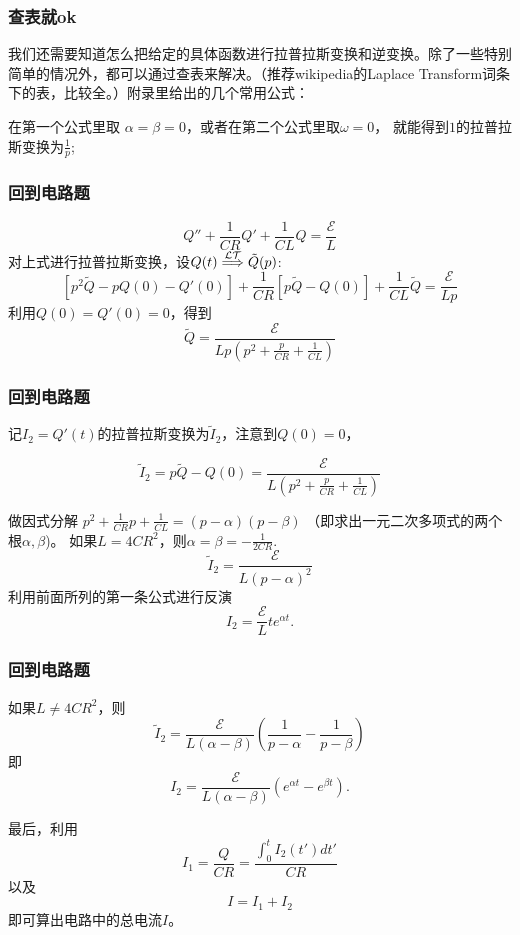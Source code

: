\documentclass[CJK]{beamer}
\begin{document}
\begin{frame}
  \frametitle{查表就ok}
  我们还需要知道怎么把给定的具体函数进行拉普拉斯变换和逆变换。除了一些特别简单的情况外，都可以通过{\blue 查表}来解决。（推荐wikipedia的Laplace Transform词条下的表，比较全。）附录里给出的几个常用公式：

在第一个公式里取 $\alpha = \beta=0$，或者在第二个公式里取$\omega = 0$， 就能得到$1$的拉普拉斯变换为$\frac{1}{p}$;

\end{frame}



\begin{frame}
  \frametitle{回到电路题}
  
  $$Q''+ \frac{1}{CR} Q' +  \frac{1}{CL}Q = \frac{\mathcal{E}}{L} $$  
  对上式进行拉普拉斯变换，设$Q(t) \stackrel{\mathcal{LT}}{\Longrightarrow} \tilde{Q}(p)$:
  $$ \left[p^2 \tilde{Q} - pQ(0) - Q'(0)\right] + \frac{1}{CR} \left[p\tilde{Q} - Q(0)\right] + \frac{1}{CL} \tilde{Q} = \frac{\mathcal{E}}{L p } $$
  利用$Q(0) = Q'(0) = 0$，得到
  $$  \tilde{Q} = \frac{\mathcal{E}}{Lp\left(p^2+\frac{p}{CR} + \frac{1}{CL}\right)} $$
  
\end{frame}

\begin{frame}
  \frametitle{回到电路题}
  
  记$I_2=Q'(t)$的拉普拉斯变换为$\tilde{I}_2$，注意到$Q(0)=0$，
  
  $$  \tilde{I}_2 =p \tilde{Q} - Q(0)= \frac{\mathcal{E}}{L\left(p^2+\frac{p}{CR} + \frac{1}{CL}\right)} $$

  做因式分解 $p^2 + \frac{1}{CR} p + \frac{1}{CL} = (p-\alpha)(p-\beta)$ （即求出一元二次多项式的两个根$\alpha,\beta$)。
    如果$L = 4CR^2$，则$\alpha = \beta = -\frac{1}{2CR}$.
  $$  \tilde{I}_2 =\frac{\mathcal{E}}{L(p-\alpha)^2} $$   
    利用前面所列的第一条公式进行反演
    $$ I_2 = \frac{\mathcal{E}}{L}t e^{\alpha t} .$$
  
\end{frame}


\begin{frame}
  \frametitle{回到电路题}
    如果$L \ne 4CR^2$，则
    $$\tilde{I}_2 = \frac{\mathcal{E}}{L(\alpha-\beta)} \left(\frac{1}{p-\alpha}-\frac{1}{p-\beta}\right) $$
    即
    $$I_2 = \frac{\mathcal{E}}{L(\alpha-\beta)}\left(e^{\alpha t}- e^{\beta t}\right).$$
  
  最后，利用
  $$I_1 = \frac{Q}{CR} = \frac{\int_0^tI_2(t')dt'}{CR}$$
  以及 $$I=I_1+I_2$$
  即可算出电路中的总电流$I$。
  
\end{frame}
\end{document}

